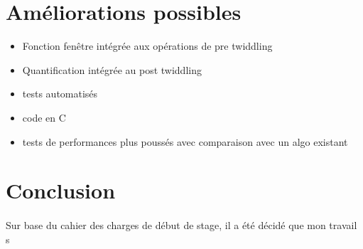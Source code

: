 \documentclass{article}
\begin{document}
    \newpage
    \section{Améliorations possibles}
    \begin{itemize}
        \item Fonction fenêtre intégrée aux opérations de pre twiddling
        \item Quantification intégrée au post twiddling
        \item tests automatisés
        \item code en C
        \item tests de performances plus poussés avec comparaison avec un algo existant
    \end{itemize}



    \newpage
    \section*{Conclusion}
    \paragraph{}
    Sur base du cahier des charges de début de stage, il a été décidé que mon travail s

     
    

    
\end{document}
